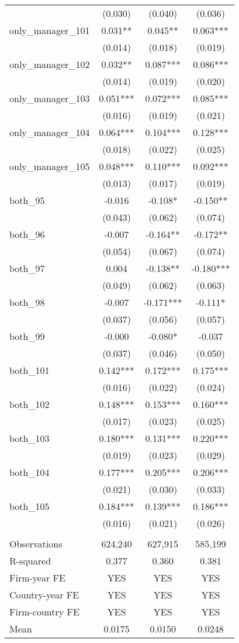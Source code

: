 \begin{tabular}{lccc}
 & (0.030) & (0.040) & (0.036) \\
only\_manager\_101 & 0.031** & 0.045** & 0.063*** \\
 & (0.014) & (0.018) & (0.019) \\
only\_manager\_102 & 0.032** & 0.087*** & 0.086*** \\
 & (0.014) & (0.019) & (0.020) \\
only\_manager\_103 & 0.051*** & 0.072*** & 0.085*** \\
 & (0.016) & (0.019) & (0.021) \\
only\_manager\_104 & 0.064*** & 0.104*** & 0.128*** \\
 & (0.018) & (0.022) & (0.025) \\
only\_manager\_105 & 0.048*** & 0.110*** & 0.092*** \\
 & (0.013) & (0.017) & (0.019) \\
both\_95 & -0.016 & -0.108* & -0.150** \\
 & (0.043) & (0.062) & (0.074) \\
both\_96 & -0.007 & -0.164** & -0.172** \\
 & (0.054) & (0.067) & (0.074) \\
both\_97 & 0.004 & -0.138** & -0.180*** \\
 & (0.049) & (0.062) & (0.063) \\
both\_98 & -0.007 & -0.171*** & -0.111* \\
 & (0.037) & (0.056) & (0.057) \\
both\_99 & -0.000 & -0.080* & -0.037 \\
 & (0.037) & (0.046) & (0.050) \\
both\_101 & 0.142*** & 0.172*** & 0.175*** \\
 & (0.016) & (0.022) & (0.024) \\
both\_102 & 0.148*** & 0.153*** & 0.160*** \\
 & (0.017) & (0.023) & (0.025) \\
both\_103 & 0.180*** & 0.131*** & 0.220*** \\
 & (0.019) & (0.023) & (0.029) \\
both\_104 & 0.177*** & 0.205*** & 0.206*** \\
 & (0.021) & (0.030) & (0.033) \\
both\_105 & 0.184*** & 0.139*** & 0.186*** \\
 & (0.016) & (0.021) & (0.026) \\
 &  &  &  \\
Observations & 624,240 & 627,915 & 585,199 \\
R-squared & 0.377 & 0.360 & 0.381 \\
Firm-year FE & YES & YES & YES \\
Country-year FE & YES & YES & YES \\
Firm-country FE & YES & YES & YES \\
 Mean & 0.0175 & 0.0150 & 0.0248 \\ \hline
\end{tabular}
